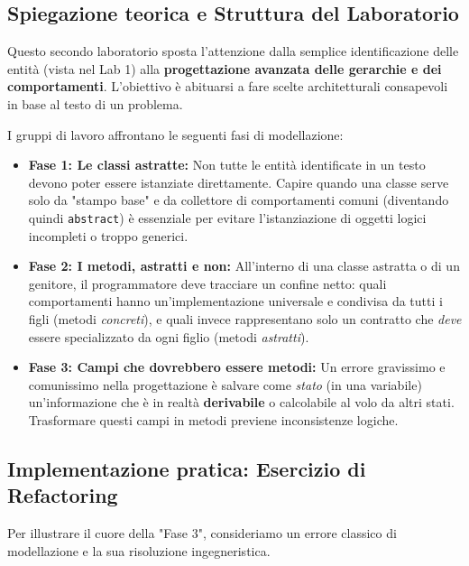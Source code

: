 \documentclass[12pt, a4paper]{article}
\begin{document}
\subsection{Spiegazione teorica e Struttura del Laboratorio}
Questo secondo laboratorio sposta l'attenzione dalla semplice identificazione delle entità (vista nel Lab 1) alla \textbf{progettazione avanzata delle gerarchie e dei comportamenti}. L'obiettivo è abituarsi a fare scelte architetturali consapevoli in base al testo di un problema.

I gruppi di lavoro affrontano le seguenti fasi di modellazione:
\begin{itemize}
    \item \textbf{Fase 1: Le classi astratte:} Non tutte le entità identificate in un testo devono poter essere istanziate direttamente. Capire quando una classe serve solo da "stampo base" e da collettore di comportamenti comuni (diventando quindi \texttt{abstract}) è essenziale per evitare l'istanziazione di oggetti logici incompleti o troppo generici.
    \item \textbf{Fase 2: I metodi, astratti e non:} All'interno di una classe astratta o di un genitore, il programmatore deve tracciare un confine netto: quali comportamenti hanno un'implementazione universale e condivisa da tutti i figli (metodi \textit{concreti}), e quali invece rappresentano solo un contratto che \textit{deve} essere specializzato da ogni figlio (metodi \textit{astratti}).
    \item \textbf{Fase 3: Campi che dovrebbero essere metodi:} Un errore gravissimo e comunissimo nella progettazione è salvare come \textit{stato} (in una variabile) un'informazione che è in realtà \textbf{derivabile} o calcolabile al volo da altri stati. Trasformare questi campi in metodi previene inconsistenze logiche.
\end{itemize}

\subsection{Implementazione pratica: Esercizio di Refactoring}
Per illustrare il cuore della "Fase 3", consideriamo un errore classico di modellazione e la sua risoluzione ingegneristica.
\end{document}
